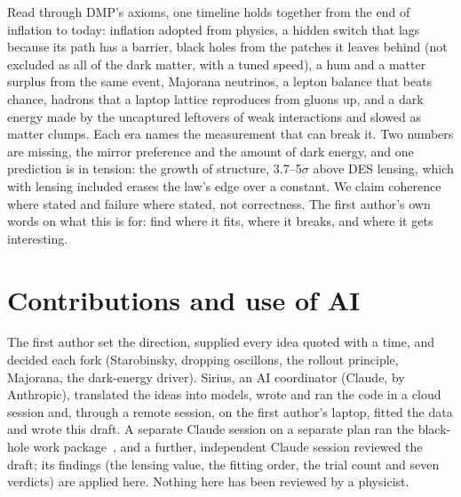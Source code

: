 \documentclass[11pt,a4paper]{article}
\begin{document}
Read through DMP's axioms, one timeline holds together from the end of inflation to today: inflation adopted from physics, a hidden switch
that lags because its path has a barrier, black holes from the patches it leaves behind (not excluded as all of the dark matter, with a tuned speed), a hum and a matter surplus from the same event,
Majorana neutrinos, a lepton balance that beats chance, hadrons that a laptop lattice reproduces from gluons up, and a dark energy made by
the uncaptured leftovers of weak interactions and slowed as matter clumps. Each era names the measurement that can break it. Two numbers
are missing, the mirror preference and the amount of dark energy, and one prediction is in tension: the growth of structure, 3.7--5$\sigma$
above DES lensing, which with lensing included erases the law's edge over a constant. We claim
coherence where stated and failure where stated, not correctness. The first author's own words on what this is for: find where it fits,
where it breaks, and where it gets interesting.

\section*{Contributions and use of AI}
The first author set the direction, supplied every idea quoted with a time, and decided each fork (Starobinsky, dropping oscillons, the rollout
principle, Majorana, the dark-energy driver). Sirius, an AI coordinator (Claude, by Anthropic), translated the ideas into models, wrote and ran the
code in a cloud session and, through a remote session, on the first author's laptop, fitted the data and wrote this draft. A separate Claude session on
a separate plan ran the black-hole work package~\cite{wpbh}, and a further, independent Claude session reviewed the draft; its
findings (the lensing value, the fitting order, the trial count and seven verdicts) are applied here. Nothing here has been reviewed by a physicist.

\appendix
\end{document}
